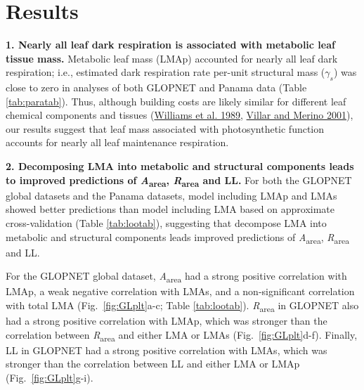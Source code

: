 \documentclass[
  12pt,
  a4paper,
,tablecaptionabove
]{scrartcl}
\begin{document}
\hypertarget{results}{%
\section{Results}\label{results}}

\textbf{1. Nearly all leaf dark respiration is associated with metabolic leaf tissue mass.}
Metabolic leaf mass (LMAp) accounted for nearly all leaf dark respiration; i.e., estimated dark respiration rate per-unit structural mass (\(\gamma_s\)) was close to zero in analyses of both GLOPNET and Panama data (Table \ref{tab:paratab}).
Thus, although building costs are likely similar for different leaf chemical components and tissues (\protect\hyperlink{ref-Williams1989}{Williams et al. 1989}, \protect\hyperlink{ref-Villar2001}{Villar and Merino 2001}), our results suggest that leaf mass associated with photosynthetic function accounts for nearly all leaf maintenance respiration.

\textbf{2. Decomposing LMA into metabolic and structural components leads to improved predictions of \emph{A}\textsubscript{area}, \emph{R}\textsubscript{area} and LL.}
For both the GLOPNET global datasets and the Panama datasets, model including LMAp and LMAs showed better predictions than model including LMA based on approximate cross-validation (Table \ref{tab:lootab}), suggesting that decompose LMA into metabolic and structural components leads improved predictions of \emph{A}\textsubscript{area}, \emph{R}\textsubscript{area} and LL.

For the GLOPNET global dataset, \emph{A}\textsubscript{area} had a strong positive correlation with LMAp, a weak negative correlation with LMAs, and a non-significant correlation with total LMA (Fig.~\ref{fig:GLplt}a-c; Table \ref{tab:lootab}).
\emph{R}\textsubscript{area} in GLOPNET also had a strong positive correlation with LMAp, which was stronger than the correlation between \emph{R}\textsubscript{area} and either LMA or LMAs (Fig.~\ref{fig:GLplt}d-f).
Finally, LL in GLOPNET had a strong positive correlation with LMAs, which was stronger than the correlation between LL and either LMA or LMAp (Fig.~\ref{fig:GLplt}g-i).
\end{document}
